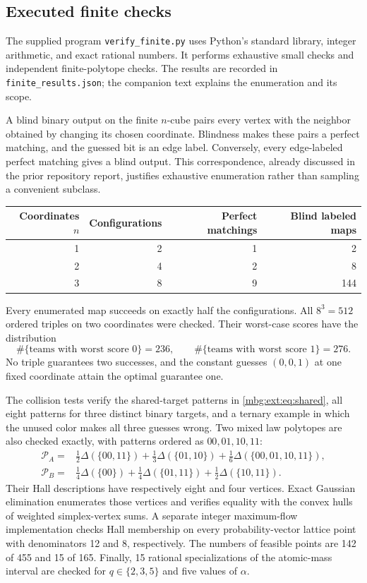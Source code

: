 \documentclass[11pt,letterpaper]{article}
\theoremstyle{definition}
\begin{document}
\subsection{Executed finite checks}

The supplied program \texttt{verify\_finite.py} uses Python's standard library, integer arithmetic, and exact rational numbers. It performs exhaustive small checks and independent finite-polytope checks. The results are recorded in \texttt{finite\_results.json}; the companion text explains the enumeration and its scope.

A blind binary output on the finite $n$-cube pairs every vertex with the neighbor obtained by changing its chosen coordinate. Blindness makes these pairs a perfect matching, and the guessed bit is an edge label. Conversely, every edge-labeled perfect matching gives a blind output. This correspondence, already discussed in the prior repository report, justifies exhaustive enumeration rather than sampling a convenient subclass.

\begin{center}
\begin{tabular}{rrrr}
\toprule
Coordinates $n$ & Configurations & Perfect matchings & Blind labeled maps\\
\midrule
1 & 2 & 1 & 2\\
2 & 4 & 2 & 8\\
3 & 8 & 9 & 144\\
\bottomrule
\end{tabular}
\end{center}
Every enumerated map succeeds on exactly half the configurations. All $8^3=512$ ordered triples on two coordinates were checked. Their worst-case scores have the distribution
\[
\#\{\text{teams with worst score }0\}=236,
\qquad
\#\{\text{teams with worst score }1\}=276.
\]
No triple guarantees two successes, and the constant guesses $(0,0,1)$ at one fixed coordinate attain the optimal guarantee one.

The collision tests verify the shared-target patterns in \eqref{mbg:ext:eq:shared}, all eight patterns for three distinct binary targets, and a ternary example in which the unused color makes all three guesses wrong. Two mixed law polytopes are also checked exactly, with patterns ordered as $00,01,10,11$:
\begin{align*}
\mathcal P_A={}&\frac12\Delta(\{00,11\})
+\frac13\Delta(\{01,10\})
+\frac16\Delta(\{00,01,10,11\}),\\
\mathcal P_B={}&\frac14\Delta(\{00\})
+\frac14\Delta(\{01,11\})
+\frac12\Delta(\{10,11\}).
\end{align*}
Their Hall descriptions have respectively eight and four vertices. Exact Gaussian elimination enumerates those vertices and verifies equality with the convex hulls of weighted simplex-vertex sums. A separate integer maximum-flow implementation checks Hall membership on every probability-vector lattice point with denominators 12 and 8, respectively. The numbers of feasible points are 142 of 455 and 15 of 165. Finally, 15 rational specializations of the atomic-mass interval are checked for $q\in\{2,3,5\}$ and five values of $\alpha$.
\end{document}
